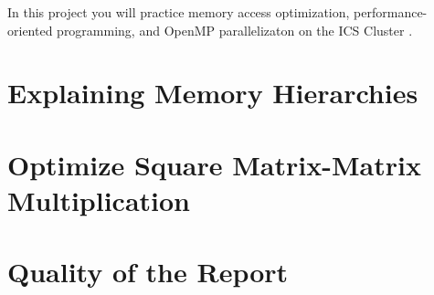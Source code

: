 \documentclass[unicode,11pt,a4paper,oneside,numbers=endperiod,openany]{scrartcl}
\begin{document}
\setassignment

\newline

\assignmentpolicy
In this project you will practice memory access optimization, performance-oriented programming, and OpenMP parallelizaton 
on the ICS Cluster .  

\section{Explaining Memory Hierarchies }


\section{Optimize Square Matrix-Matrix Multiplication  }


\section{Quality of the Report  }
\end{document}
